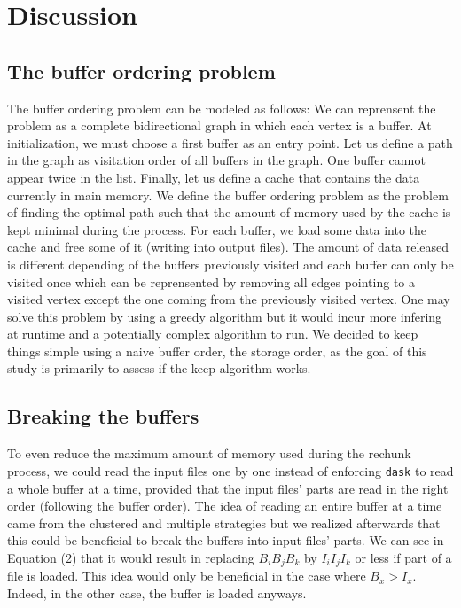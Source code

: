 \documentclass[conference]{IEEEtran}
\begin{document}
\section{Discussion}

\subsection{The buffer ordering problem}
The buffer ordering problem can be modeled as follows: We can reprensent the
problem as a complete bidirectional graph in which each vertex is a buffer. At
initialization, we must choose a first buffer as an entry point. Let us define
a path in the graph as visitation order of all buffers in the graph. One buffer
cannot appear twice in the list. Finally, let us define a cache that contains
the data currently in main memory. We define the buffer ordering problem as the
problem of finding the optimal path such that the amount of memory used by the
cache is kept minimal during the process. For each buffer, we load some data
into the cache and free some of it (writing into output files). The amount of
data released is different depending of the buffers previously visited and each
buffer can only be visited once which can be reprensented by removing all edges
pointing to a visited vertex except the one coming from the previously visited
vertex. One may solve this problem by using a greedy algorithm but it would
incur more infering at runtime and a potentially complex algorithm to run.
We decided to keep things simple using a naive buffer order, the storage order,
as the goal of this study is primarily to assess if the keep algorithm works.

\subsection{Breaking the buffers}
To even reduce the maximum amount of memory used during the rechunk process, we
could read the input files one by one instead of enforcing \texttt{dask} to read a whole
buffer at a time, provided that the input files' parts are read in the right
order (following the buffer order). The idea of reading an entire buffer at a
time came from the clustered and multiple strategies but we realized afterwards
that this could be beneficial to break the buffers into input files' parts. We
can see in Equation (2) that it would result in replacing $B_iB_jB_k$ by
$I_iI_jI_k$ or less if part of a file is loaded. This idea would only be
beneficial in the case where $B_x>I_x$. Indeed, in the other case, the buffer is
loaded anyways.
\end{document}

